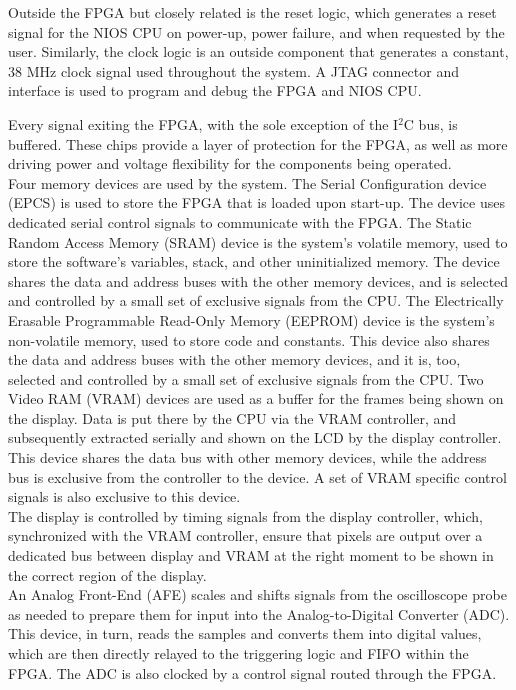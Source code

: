 \documentclass[titlepage]{scrartcl}
\begin{document}
	Outside the FPGA but closely related is the reset logic, which generates a reset signal for the NIOS CPU on power-up, power failure, and when requested by the user. Similarly, the clock logic is an outside component that generates a constant, 38 MHz clock signal used throughout the system. A JTAG connector and interface is used to program and debug the FPGA and NIOS CPU.\\

	\clearpage 

	Every signal exiting the FPGA, with the sole exception of the I$^2$C bus, is buffered. These chips provide a layer of protection for the FPGA, as well as more driving power and voltage flexibility for the components being operated.\\

	Four memory devices are used by the system. The Serial Configuration device (EPCS) is used to store the FPGA that is loaded upon start-up. The device uses dedicated serial control signals to communicate with the FPGA. The Static Random Access Memory (SRAM) device is the system's volatile memory, used to store the software's variables, stack, and other uninitialized memory. The device shares the data and address buses with the other memory devices, and is selected and controlled by a small set of exclusive signals from the CPU. The Electrically Erasable Programmable Read-Only Memory (EEPROM) device is the system's non-volatile memory, used to store code and constants. This device also shares the data and address buses with the other memory devices, and it is, too, selected and controlled by a small set of exclusive signals from the CPU. Two Video RAM (VRAM) devices are used as a buffer for the frames being shown on the display. Data is put there by the CPU via the VRAM controller, and subsequently extracted serially and shown on the LCD by the display controller. This device shares the data bus with other memory devices, while the address bus is exclusive from the controller to the device. A set of VRAM specific control signals is also exclusive to this device.\\

	The display is controlled by timing signals from the display controller, which, synchronized with the VRAM controller, ensure that pixels are output over a dedicated bus between display and VRAM at the right moment to be shown in the correct region of the display.\\

	An Analog Front-End (AFE) scales and shifts signals from the oscilloscope probe as needed to prepare them for input into the Analog-to-Digital Converter (ADC). This device, in turn, reads the samples and converts them into digital values, which are then directly relayed to the triggering logic and FIFO within the FPGA. The ADC is also clocked by a control signal routed through the FPGA.\\
\end{document}
